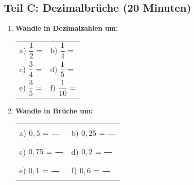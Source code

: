 \subsection*{Teil C: Dezimalbrüche (20 Minuten)}

\begin{enumerate}[label=\arabic*.]
    \item \textbf{Wandle in Dezimalzahlen um:}
    \vspace{0.5cm}

    \begin{tabular}{ll}
        a) $\dfrac{1}{2}$ = \underline{\hspace{2cm}} & b) $\dfrac{1}{4}$ = \underline{\hspace{2cm}} \\[2ex]
        c) $\dfrac{3}{4}$ = \underline{\hspace{2cm}} & d) $\dfrac{1}{5}$ = \underline{\hspace{2cm}} \\[2ex]
        e) $\dfrac{3}{5}$ = \underline{\hspace{2cm}} & f) $\dfrac{1}{10}$ = \underline{\hspace{2cm}}
    \end{tabular}

    \vspace{1cm}

    \item \textbf{Wandle in Brüche um:}
    \vspace{0.5cm}

    \begin{tabular}{ll}
        a) $0,5$ = $\dfrac{\phantom{00}}{\phantom{00}}$ & b) $0,25$ = $\dfrac{\phantom{00}}{\phantom{00}}$ \\[3ex]
        c) $0,75$ = $\dfrac{\phantom{00}}{\phantom{00}}$ & d) $0,2$ = $\dfrac{\phantom{00}}{\phantom{00}}$ \\[3ex]
        e) $0,1$ = $\dfrac{\phantom{00}}{\phantom{00}}$ & f) $0,6$ = $\dfrac{\phantom{00}}{\phantom{00}}$
    \end{tabular}

\end{enumerate}